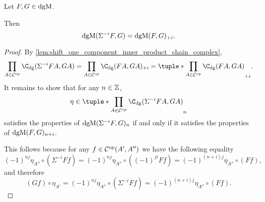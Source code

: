 \begin{lemma}
    \label{lem:dgmod_shift_eq_plus}
    Let \( F, G \in \operatorname{dgM} \).

    Then
    \[
        \operatorname{dgM}(\Sigma^{-i} F, G) = \operatorname{dgM}(F, G)_{+i}.
    \]
\end{lemma}
\begin{proof}
    By \autoref{lem:shift_one_component_inner_product_chain_complex},
    \[
        \prod_{A \in \Cc^{\op}} \C_{\dg}(\Sigma^{-i} F A, G A) = \prod_{A \in \Cc^{\op}} \C_{\dg}(F A, G A)_{+i} = \tuple*{\prod_{A \in \Cc^{\op}} \C_{\dg}(F A, G A)}_{+i}.
    \]
    It remains to show that for any \( n \in {\mathbb{Z}} \),
    \[
        \eta \in \tuple*{\prod_{A \in \Cc^{\op}} \C_{\dg}(\Sigma^{-i} F A, G A)}_n
    \]
    satisfies the properties of \( \operatorname{dgM}(\Sigma^{-i} F, G)_n \) if and only if it satisfies the properties of \( \operatorname{dgM}(F, G)_{n + i} \).

    This follows because for any \( f \in {\mathcal{C}}^{\operatorname{op}}(A', A'') \) we have the following equality
    \[
        (-1)^{nj} \eta_{A''} \circ (\Sigma^{-i} F f) = (-1)^{nj} \eta_{A''} \circ ((-1)^{ji}F f) = (-1)^{(n + i)j}\eta_{A''} \circ (F f),
    \]
    and therefore
    \[
        (G f) \circ \eta_{A'} = (-1)^{nj} \eta_{A''} \circ (\Sigma^{-i} F f) = (-1)^{(n + i)j}\eta_{A''} \circ (F f).
    \]
\end{proof}



